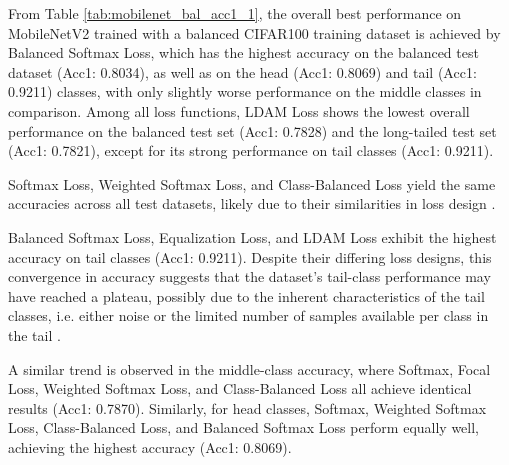 From Table \ref{tab:mobilenet_bal_acc1_1}, the overall best performance on MobileNetV2 trained with a balanced CIFAR100 training dataset is achieved by Balanced Softmax Loss, which has the highest accuracy on the balanced test dataset (Acc1: 0.8034), as well as on the head (Acc1: 0.8069) and tail (Acc1: 0.9211) classes, with only slightly worse performance on the middle classes in comparison. Among all loss functions, LDAM Loss shows the lowest overall performance on the balanced test set (Acc1: 0.7828) and the long-tailed test set (Acc1: 0.7821), except for its strong performance on tail classes (Acc1: 0.9211). %

Softmax Loss, Weighted Softmax Loss, and Class-Balanced Loss yield the same accuracies across all test datasets, likely due to their similarities in loss design  .

Balanced Softmax Loss, Equalization Loss, and LDAM Loss exhibit the highest accuracy on tail classes (Acc1: 0.9211). Despite their differing loss designs, this convergence in accuracy suggests that the dataset's tail-class performance may have reached a plateau, possibly due to the inherent characteristics of the tail classes, i.e. either noise or the limited number of samples available per class in the tail .

A similar trend is observed in the middle-class accuracy, where Softmax, Focal Loss, Weighted Softmax Loss, and Class-Balanced Loss all achieve identical results (Acc1: 0.7870). Similarly, for head classes, Softmax, Weighted Softmax Loss, Class-Balanced Loss, and Balanced Softmax Loss perform equally well, achieving the highest accuracy (Acc1: 0.8069). %





